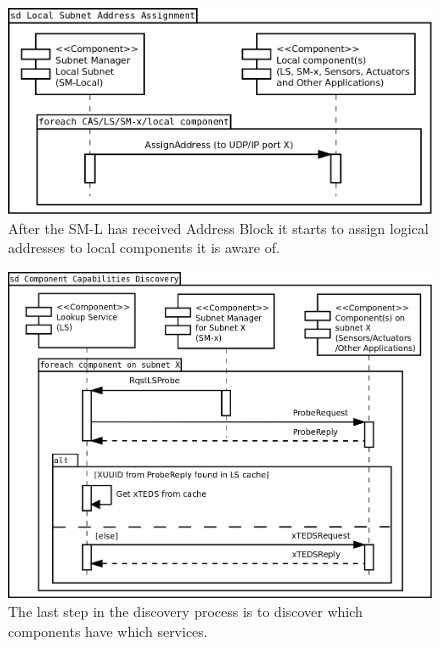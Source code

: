 \begin{figure}[h]
    \centering
    \includegraphics[width=\textwidth]{figures/vn_local_subnet_address_assignment}
    \caption{After the SM-L has received Address Block it starts to assign
    logical addresses to local components it is aware of.}
    \label{fig:appendix_vn_local_subnet_address_assignment}
\end{figure}

\begin{figure}[h]
    \centering
    \includegraphics[width=\textwidth]{figures/vn_component_capabilities_discovery}
    \caption{The last step in the discovery process is to discover which
    components have which services.}
    \label{fig:appendix_vn_component_capabilities_discovery}
\end{figure}
